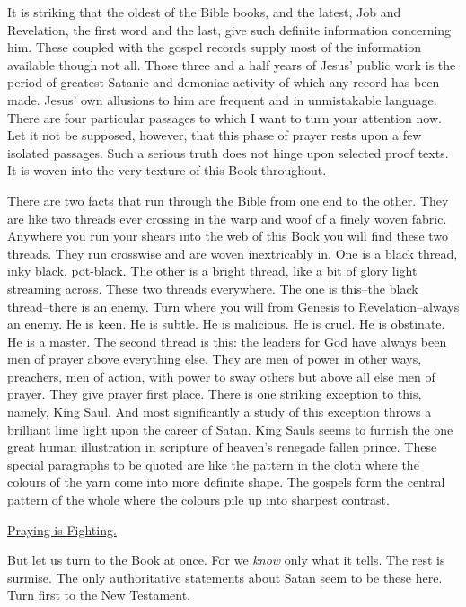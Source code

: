 It is striking that the oldest of the Bible books, and the latest, Job and
Revelation, the first word and the last, give such definite information
concerning him. These coupled with the gospel records supply most of the
information available though not all. Those three and a half years of
Jesus' public work is the period of greatest Satanic and demoniac
activity of which any record has been made. Jesus' own allusions to him
are frequent and in unmistakable language. There are four particular
passages to which I want to turn your attention now. Let it not be
supposed, however, that this phase of prayer rests upon a few isolated
passages. Such a serious truth does not hinge upon selected proof texts.
It is woven into the very texture of this Book throughout.

There are two facts that run through the Bible from one end to the other.
They are like two threads ever crossing in the warp and woof of a finely
woven fabric. Anywhere you run your shears into the web of this Book you
will find these two threads. They run crosswise and are woven inextricably
in. One is a black thread, inky black, pot-black. The other is a bright
thread, like a bit of glory light streaming across. These two threads
everywhere. The one is this--the black thread--there is an enemy. Turn
where you will from Genesis to Revelation--always an enemy. He is keen. He
is subtle. He is malicious. He is cruel. He is obstinate. He is a master.
The second thread is this: the leaders for God have always been men of
prayer above everything else. They are men of power in other ways,
preachers, men of action, with power to sway others but above all else men
of prayer. They give prayer first place. There is one striking exception
to this, namely, King Saul. And most significantly a study of this
exception throws a brilliant lime light upon the career of Satan. King
Sauls seems to furnish the one great human illustration in scripture of
heaven's renegade fallen prince. These special paragraphs to be quoted are
like the pattern in the cloth where the colours of the yarn come into more
definite shape. The gospels form the central pattern of the whole where
the colours pile up into sharpest contrast.



\underline{Praying is Fighting.}


But let us turn to the Book at once. For we \textit{know} only what it tells. The
rest is surmise. The only authoritative statements about Satan seem to be
these here. Turn first to the New Testament.

